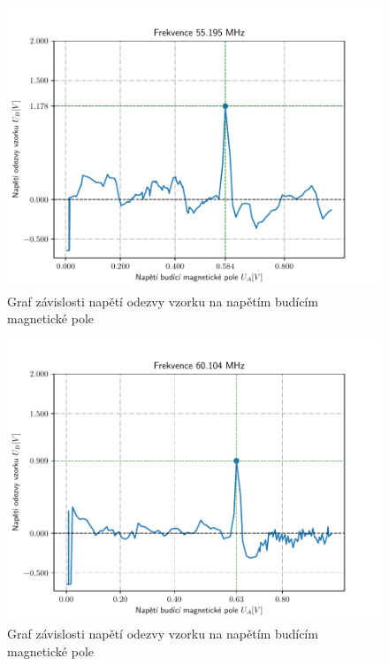 \documentclass{article}
\begin{document}
\begin{figure}[!h]
  \hspace*{-10em}
  \includegraphics[scale=1.2]{figs/3.pdf}
  \caption{Graf závislosti napětí odezvy vzorku na napětím budícím magnetické pole}
\end{figure}
\begin{figure}[!h]
  \hspace*{-10em}
  \includegraphics[scale=1.2]{figs/4.pdf}
  \caption{Graf závislosti napětí odezvy vzorku na napětím budícím magnetické pole}
\end{figure}
\end{document}
